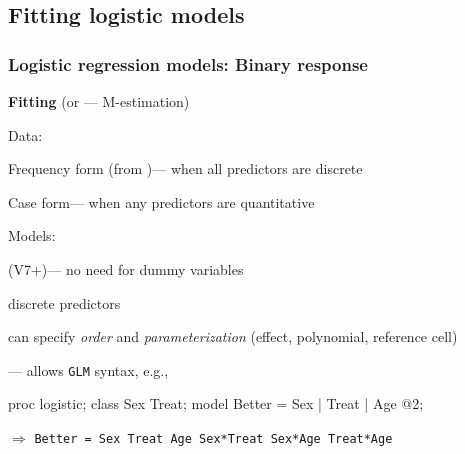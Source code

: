 \renewcommand{\FileName}{logistic2}

\subsection{Fitting logistic models}
\begin{frame}[fragile]
  \frametitle{Logistic regression models: Binary response}
  \begin{block}{\large\bfseries Fitting}  (or --- M-estimation)
     \begin{itemize*}
	    \item Data:
    	\begin{itemize*}
		   \item Frequency form (from )--- when all predictors are discrete
		   \item Case form--- when any predictors are quantitative
		  \end{itemize*}
	  \item Models:  
    	\begin{itemize*}
		\item {} (V7+)--- no need for dummy variables
    	   \begin{itemize*}
		   \item discrete predictors
		   \item can specify \emph{order} and \emph{parameterization} (effect, polynomial, reference
		   cell)
		   \end{itemize*}
		\item {}--- allows \texttt{GLM} syntax, e.g., 

\begin{listing}[frame=single]
proc logistic;
  class Sex Treat;
  model Better = Sex | Treat | Age @2;
\end{listing}

		\item $\Rightarrow$ \texttt{Better = Sex Treat Age Sex*Treat Sex*Age Treat*Age}
		\end{itemize*}
	  \end{itemize*}
  \end{block}
\end{frame}

